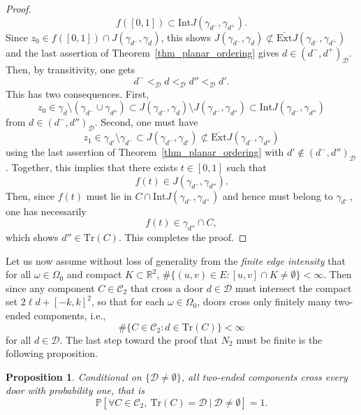 \documentclass[a4paper, 11pt]{article} %
\theoremstyle{plain}
\newtheorem{proposition}[theorem]{Proposition}
\newcommand{\trace}{\mathrm{Tr}}
\newcommand{\Int}{\mathrm{Int}}
\newcommand{\clExt}{\overline{\mathrm{Ext}}}
\newcommand{\D}{\mathcal D}
\newcommand{\R}{\mathbb{R}}
\newcommand{\1}{\mathds 1}
\renewcommand{\P}{\mathbb{P}}
\numberwithin{equation}{section}
\begin{document}
\begin{proof}
        \[f([0,1])\subset\Int J(\gamma_{d^-}, \gamma_{d^+}).\]
    Since $z_0\in f([0,1])\cap J(\gamma_{d^-}, \gamma_{d})$, this shows $J(\gamma_{d^-},\gamma_d)\not\subset\clExt J(\gamma_{d^-},\gamma_{d^+})$ and the last assertion of Theorem~\ref{thm_planar_ordering} gives $d\in(d^-,d^+)_\D$. Then, by transitivity, one gets
        \[d^-<_\D d<_\D d''<_\D d'.\]
    This has two consequences. First,
        \[z_0\in\gamma_d\setminus(\gamma_{d^-}\cup\gamma_{d''})\subset J(\gamma_{d^-},\gamma_{d})\setminus J(\gamma_{d^-},\gamma_{d''})\subset\Int J(\gamma_{d^-},\gamma_{d''})\]
    from $d\in(d^-,d'')_\D$. Second, one must have
        \[z_1\in\gamma_{d'}\setminus\gamma_{d^-}\subset J(\gamma_{d^-},\gamma_{d'})\not\subset\clExt J(\gamma_{d^-},\gamma_{d''})\]
    using the last assertion of Theorem~\ref{thm_planar_ordering} with $d'\notin(d^-,d'')_\D$. Together, this implies that there exists $t\in[0,1]$ such that
        \[f(t)\in J(\gamma_{d^-},\gamma_{d''}).\]
    Then, since $f(t)$ must lie in $C\cap\Int J(\gamma_{d^-}, \gamma_{d^+})$ and hence must belong to $\gamma_{d^-}$, one has necessarily
        \[f(t)\in\gamma_{d''}\cap C,\]
    which shows $d''\in\trace(C)$. This completes the proof.
\end{proof}


Let us now assume without loss of generality from the \emph{finite edge intensity} that for all $\omega\in\Omega_0$ and compact $K\subset\R^2$, $\#\{(u, v)\in E:[u, v]\cap K\neq\emptyset\}<\infty$. Then since any component $C\in\mathcal C_2$ that cross a door $d\in\D$ must intersect the compact set $2\ell d+[-k, k]^2$, so that for each $\omega\in\Omega_0$, doors cross only finitely many two-ended components, i.e.,
    \[\#\{C\in\mathcal C_2:d\in\trace(C)\}<\infty\]
for all $d\in\D$. The last step toward the proof that $N_2$ must be finite is the following proposition.


\begin{proposition}
    \label{prop_cross_all_doors}
    Conditional on $\{\D\neq\emptyset\}$, all two-ended components cross every door with probability one, that is
        \[\P[\forall C\in\mathcal C_2,~\trace(C)=\D~|~\D\neq\emptyset]=1.\]
\end{proposition}
\end{document}

